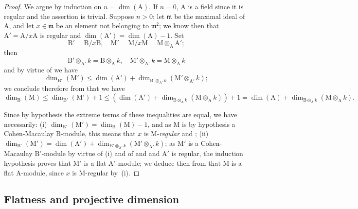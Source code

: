 \begin{proof}
We argue by induction on $n=\dim(\mathrm{A})$.
If $n=0$, $\mathrm{A}$ is a field since it is regular  and the assertion is trivial.
Suppose $n>0$; let $\mathfrak{m}$ be the maximal ideal of $\mathrm{A}$, and let $x\in\mathfrak{m}$ be an element not belonging to $\mathfrak{m}^2$; we know then  that $\mathrm{A}'=\mathrm{A}/x\mathrm{A}$ is regular and $\dim(\mathrm{A}')=\dim(\mathrm{A})-1$.
Set
\[
  \mathrm{B}'=\mathrm{B}/x\mathrm{B},\quad \mathrm{M}'=\mathrm{M}/x\mathrm{M}=\mathrm{M}\otimes_\mathrm{A}\mathrm{A}';
\]
then
\[
  \mathrm{B}'\otimes_{\mathrm{A}'}k=\mathrm{B}\otimes_\mathrm{A} k,\quad \mathrm{M}'\otimes_{\mathrm{A}'}k=\mathrm{M}\otimes_\mathrm{A} k
\]
and by virtue of  we have
\[
  \dim_{\mathrm{B}'}(\mathrm{M}')\leqslant\dim(\mathrm{A}')+\dim_{\mathrm{B}'\otimes_{\mathrm{A}'}k}(\mathrm{M}'\otimes_{\mathrm{A}'} k);
\]
we conclude therefore from  that we have
\[
  \dim_\mathrm{B}(\mathrm{M})\leqslant\dim_{\mathrm{B}'}(\mathrm{M}')+1\leqslant(\dim(\mathrm{A}')+\dim_{\mathrm{B}\otimes_\mathrm{A} k}(\mathrm{M}\otimes_\mathrm{A} k))+1=\dim(\mathrm{A})+\dim_{\mathrm{B}\otimes_\mathrm{A} k}(\mathrm{M}\otimes_\mathrm{A} k).
\]

Since by hypothesis the extreme terms of these inequalities are equal, we have necessarily: (i) $\dim_{\mathrm{B}'}(\mathrm{M}')=\dim_\mathrm{B}(\mathrm{M})-1$, and as $\mathrm{M}$ is by hypothesis a Cohen-Macaulay $\mathrm{B}$-module, this means that $x$ is M-\emph{regular}  and ; (ii) $\dim_{\mathrm{B}'}(\mathrm{M}')=\dim(\mathrm{A}')+\dim_{\mathrm{B}'\otimes_{\mathrm{A}'}k}(\mathrm{M}'\otimes_{\mathrm{A}'}k)$; as $\mathrm{M}'$ is a Cohen-Macaulay $\mathrm{B}'$-module by virtue of (i) and of  and  and $\mathrm{A}'$ is regular, the induction hypothesis proves that $\mathrm{M}'$ is a flat $\mathrm{A}'$-module; we deduce then from  that $\mathrm{M}$ is a flat $\mathrm{A}$-module, since $x$ is M-regular by~(i).
\end{proof}

\subsection{Flatness and projective dimension}
\label{subsection:IV.6.2}

